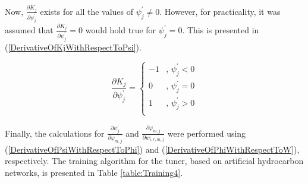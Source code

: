 \documentclass{ieeeaccess}
\begin{document}
Now, \(\frac{\partial K_j}{\partial\psi_j^\prime}\) exists for all the values of \(\psi_j^\prime\neq0\). However, for practicality, it was assumed that \(\frac{\partial K_j}{\partial\psi_j^\prime}=0\) would hold true for \(\psi_j^\prime=0\). This is presented in (\ref{DerivativeOfKjWithRespectToPsi}).

\begin{equation}\label{DerivativeOfKjWithRespectToPsi}
	\frac{\partial K_j}{\partial\psi_j^\prime}=
 \begin{cases}
 -1 &,\, \psi_j^\prime<0\\
 0 &,\, \psi_j^\prime=0\\
 1 &,\, \psi_j^\prime>0\\
 \end{cases}
\end{equation}

Finally, the calculations for \(\frac{\partial\psi_j^\prime}{\partial\varphi_{m,j}}\) and \(\frac{\partial\varphi_{m,j}}{ \partial w_{i,r,m,j}}\) were performed using (\ref{DerivativeOfPsiWithRespectToPhi}) and (\ref{DerivativeOfPhiWithRespectToW}), respectively.
The training algorithm for the tuner, based on artificial hydrocarbon networks, is presented in Table \ref{table:Training4}.
\end{document}
